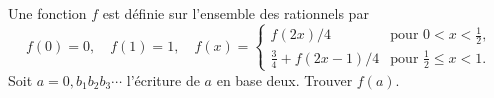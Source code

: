 Une fonction $f$ est définie sur l'ensemble des rationnels par
\[ f(0) = 0,\quad f(1) = 1,\quad f(x) = \begin{cases} f(2x)/4 & \text{pour } 0 < x < \frac{1}{2},\\ \frac{3}{4} + f(2x - 1)/4 & \text{pour } \frac{1}{2} \leq x < 1. \end{cases} \]
Soit $a = 0{,}b_1b_2b_3\cdots$ l'écriture de $a$ en base deux. Trouver $f(a)$.
